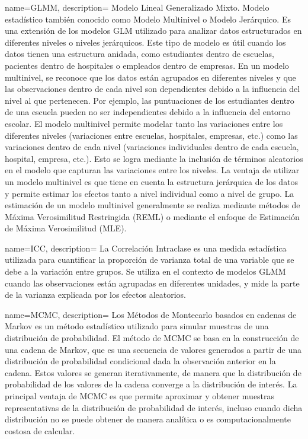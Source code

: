 {
    name=GLMM,
    description={
        Modelo Lineal Generalizado Mixto. Modelo estadístico también conocido como Modelo Multinivel o Modelo Jerárquico.
        Es una extensión de los modelos \gls{GLM} utilizado para analizar datos estructurados en diferentes niveles o niveles jerárquicos.
        Este tipo de modelo es útil cuando los datos tienen una estructura anidada, como estudiantes dentro de escuelas,
        pacientes dentro de hospitales o empleados dentro de empresas.
        En un modelo multinivel, se reconoce que los datos están agrupados en diferentes niveles
        y que las observaciones dentro de cada nivel son dependientes debido a la influencia del nivel
        al que pertenecen. Por ejemplo, las puntuaciones de los estudiantes dentro de una escuela pueden no ser independientes
        debido a la influencia del entorno escolar.
        El modelo multinivel permite modelar tanto las variaciones entre los diferentes niveles
        (variaciones entre escuelas, hospitales, empresas, etc.)
        como las variaciones dentro de cada nivel (variaciones individuales dentro de cada escuela, hospital, empresa, etc.).
        Esto se logra mediante la inclusión de términos aleatorios en el modelo que capturan
        las variaciones entre los niveles. La ventaja de utilizar un modelo multinivel es que tiene en cuenta la estructura jerárquica de los datos y permite estimar los efectos tanto a nivel individual como a nivel de grupo. La estimación de un modelo multinivel generalmente se realiza mediante métodos de Máxima Verosimilitud Restringida (REML) o mediante el enfoque de Estimación de Máxima Verosimilitud (MLE).
    }
}


{
    name=ICC,
    description={
        La Correlación Intraclase es una medida estadística utilizada para cuantificar la proporción de varianza total
        de una variable que se debe a la variación entre grupos. Se utiliza en el contexto de modelos \gls{GLMM}
        cuando las observaciones están agrupadas en diferentes unidades,
        y mide la parte de la varianza explicada por los
        efectos aleatorios.
    }
}

{
    name=MCMC,
    description={
        Los Métodos de Montecarlo basados en cadenas de Markov es un método estadístico utilizado para simular
        muestras de una distribución de probabilidad.
        El método de MCMC se basa en la construcción de una cadena de Markov,
        que es una secuencia de valores generados a partir de una distribución de probabilidad condicional dada
        la observación anterior en la cadena.
        Estos valores se generan iterativamente, de manera que la distribución de probabilidad de los valores
        de la cadena converge a la distribución de interés.        
        La principal ventaja de MCMC es que permite aproximar
        y obtener muestras representativas de la distribución de probabilidad de interés,
        incluso cuando dicha distribución no se puede obtener de manera analítica o es
        computacionalmente costosa de calcular.
    }
}


